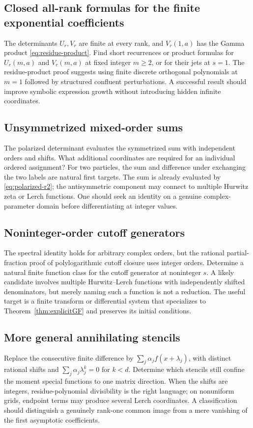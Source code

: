 \subsection{Closed all-rank formulas for the finite exponential coefficients}
The determinants $U_r,V_r$ are finite at every rank, and $V_r(1,a)$
has the Gamma product \eqref{eq:residue-product}. Find short recurrences
or product formulas for $U_r(m,a)$ and $V_r(m,a)$ at fixed integer
$m\ge2$, or for their jets at $s=1$. The residue-product proof suggests
using finite discrete orthogonal polynomials at $m=1$ followed by
structured confluent perturbations. A successful result should improve
symbolic expression growth without introducing hidden infinite coordinates.

\subsection{Unsymmetrized mixed-order sums}
The polarized determinant evaluates the symmetrized sum with independent
orders and shifts. What additional coordinates are required for an
individual ordered assignment? For two particles, the sum and difference
under exchanging the two labels are natural first targets. The sum is
already evaluated by \eqref{eq:polarized-r2}; the antisymmetric component
may connect to multiple Hurwitz zeta or Lerch functions. One should seek
an identity on a genuine complex-parameter domain before differentiating
at integer values.

\subsection{Noninteger-order cutoff generators}
The spectral identity holds for arbitrary complex orders, but the rational
partial-fraction proof of polylogarithmic cutoff closure uses integer
orders. Determine a natural finite function class for the cutoff generator
at noninteger $s$. A likely candidate involves multiple Hurwitz--Lerch
functions with independently shifted denominators, but merely naming such
a function is not a reduction. The useful target is a finite transform
or differential system that specializes to Theorem~\ref{thm:explicitGF}
and preserves its initial conditions.

\subsection{More general annihilating stencils}
Replace the consecutive finite difference by
$\sum_j\alpha_j f(x+\lambda_j)$, with distinct rational shifts and
$\sum_j\alpha_j\lambda_j^k=0$ for $k<d$. Determine which stencils
still confine the moment special functions to one matrix direction.
When the shifts are integers, residue-polynomial divisibility is the
right language; on nonuniform grids, endpoint terms may produce several
Lerch coordinates. A classification should distinguish a genuinely
rank-one common image from a mere vanishing of the first asymptotic
coefficients.

